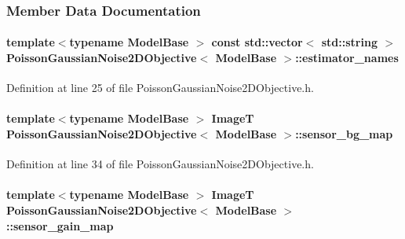 \subsubsection{Member Data Documentation}
\paragraph[{\texorpdfstring{estimator\+\_\+names}{estimator_names}}]{\setlength{\rightskip}{0pt plus 5cm}template$<$typename Model\+Base $>$ const std\+::vector$<$ std\+::string $>$ {\bf Poisson\+Gaussian\+Noise2\+D\+Objective}$<$ Model\+Base $>$\+::estimator\+\_\+names\hspace{0.3cm}{\ttfamily [static]}}\hypertarget{classPoissonGaussianNoise2DObjective_afc77f6a06f55c371a831f9e1ecc82ee3}{}\label{classPoissonGaussianNoise2DObjective_afc77f6a06f55c371a831f9e1ecc82ee3}


Definition at line 25 of file Poisson\+Gaussian\+Noise2\+D\+Objective.\+h.

\paragraph[{\texorpdfstring{sensor\+\_\+bg\+\_\+map}{sensor_bg_map}}]{\setlength{\rightskip}{0pt plus 5cm}template$<$typename Model\+Base $>$ ImageT {\bf Poisson\+Gaussian\+Noise2\+D\+Objective}$<$ Model\+Base $>$\+::sensor\+\_\+bg\+\_\+map}\hypertarget{classPoissonGaussianNoise2DObjective_a84c763dc1db0d927cc1f8bcecdb3b663}{}\label{classPoissonGaussianNoise2DObjective_a84c763dc1db0d927cc1f8bcecdb3b663}


Definition at line 34 of file Poisson\+Gaussian\+Noise2\+D\+Objective.\+h.

\paragraph[{\texorpdfstring{sensor\+\_\+gain\+\_\+map}{sensor_gain_map}}]{\setlength{\rightskip}{0pt plus 5cm}template$<$typename Model\+Base $>$ ImageT {\bf Poisson\+Gaussian\+Noise2\+D\+Objective}$<$ Model\+Base $>$\+::sensor\+\_\+gain\+\_\+map}\hypertarget{classPoissonGaussianNoise2DObjective_aa28337c212470a6a5a152e691bcb7d45}{}\label{classPoissonGaussianNoise2DObjective_aa28337c212470a6a5a152e691bcb7d45}


